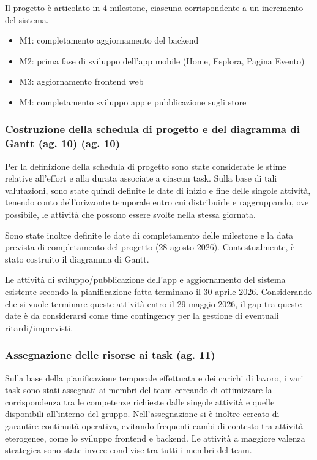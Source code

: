\documentclass[11pt,a4paper]{article}
\providecommand{\tightlist}{\setlength{\itemsep}{0pt}\setlength{\parskip}{0pt}}
\begin{document}
{Il progetto è articolato in 4 milestone, ciascuna corrispondente a un incremento del sistema.}

\begin{itemize}
\tightlist
\item
  {M1: completamento aggiornamento del backend }
\item
  {M2: prima fase di sviluppo dell’app mobile (Home, Esplora, Pagina Evento)}
\item
  {M3: aggiornamento frontend web}
\item
  {M4: completamento sviluppo app e pubblicazione sugli store}
\end{itemize}

\subsubsection{\texorpdfstring{{Costruzione della schedula di progetto e del diagramma di Gantt (ag. 10)}}{Costruzione della schedula di progetto e del diagramma di Gantt} (ag. 10)}\label{h.a1n4ykbpaol8}

{Per la definizione della schedula di progetto sono state considerate le stime relative all’effort e alla durata associate a ciascun task. Sulla base di tali valutazioni, sono state quindi definite le date di inizio e fine delle singole attività, tenendo conto dell’orizzonte temporale entro cui distribuirle e raggruppando, ove possibile, le attività che possono essere svolte nella stessa giornata.}

{Sono state inoltre definite le date di completamento delle milestone e la data prevista di completamento del progetto (28 agosto 2026). Contestualmente, è stato costruito il diagramma di Gantt. }

{Le attività di sviluppo/pubblicazione dell’app e aggiornamento del sistema esistente secondo la pianificazione fatta terminano il 30 aprile 2026. Considerando che si vuole terminare queste attività entro il 29 maggio 2026, il gap tra queste date è da considerarsi come time contingency per la gestione di eventuali ritardi/imprevisti.}

\subsubsection{\texorpdfstring{{Assegnazione delle risorse ai task (ag. 11)}}{Assegnazione delle risorse ai task (ag. 11)}}\label{h.b2ob6yka6cor}

{Sulla base della pianificazione temporale effettuata e dei carichi di lavoro, i vari task sono stati assegnati ai membri del team cercando di ottimizzare la corrispondenza tra le competenze richieste dalle singole attività e quelle disponibili all’interno del gruppo. Nell’assegnazione si è inoltre cercato di garantire continuità operativa, evitando frequenti cambi di contesto tra attività eterogenee, come lo sviluppo frontend e backend. Le attività a maggiore valenza strategica sono state invece condivise tra tutti i membri del team.}
\end{document}
